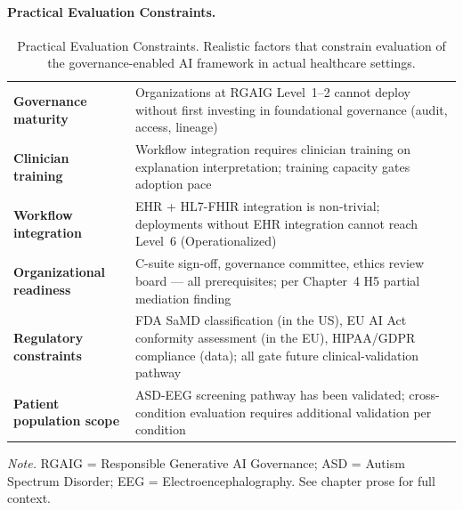 \paragraph{Practical Evaluation Constraints.}




{\tablestripes\tablefontsize
{}
\begin{xltabular}{\textwidth}{@{} >{\raggedright\arraybackslash}p{3.0cm} L @{}}
\caption[Practical Evaluation Constraints]{Practical Evaluation Constraints. Realistic factors that constrain evaluation of the governance-enabled AI framework in actual healthcare settings.}\label{tab:appo_deployment_constraints} \\
\toprule
{} &  \\
\midrule
\endfirsthead
\endhead
\bottomrule
\endlastfoot
\textbf{Governance maturity}     & Organizations at RGAIG Level~1--2 cannot deploy without first investing in foundational governance (audit, access, lineage) \\
\textbf{Clinician training}      & Workflow integration requires clinician training on explanation interpretation; training capacity gates adoption pace \\
\textbf{Workflow integration}    & EHR + HL7-FHIR integration is non-trivial; deployments without EHR integration cannot reach Level~6 (Operationalized) \\
\textbf{Organizational readiness} & C-suite sign-off, governance committee, ethics review board --- all prerequisites; per Chapter~4 H5 partial mediation finding \\
\textbf{Regulatory constraints}  & FDA SaMD classification (in the US), EU AI Act conformity assessment (in the EU), HIPAA/GDPR compliance (data); all gate future clinical-validation pathway \\
\textbf{Patient population scope} & ASD-EEG screening pathway has been validated; cross-condition evaluation requires additional validation per condition \\
\end{xltabular}}
\vspace{0.3em}\noindent\textit{Note.} RGAIG = Responsible Generative AI Governance; ASD = Autism Spectrum Disorder; EEG = Electroencephalography. See chapter prose for full context.

